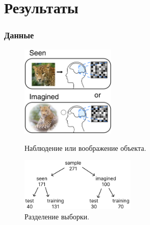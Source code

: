 \documentclass{beamer}
\begin{document}
	\section{Результаты}
	\begin{frame} 
		\frametitle{Данные}
		\begin{figure}
			\begin{minipage}{4.5cm}
				\includegraphics[width=4.5cm]{../images/data_1.png}
				\caption{Наблюдение или воображение объекта.} 
				\label{fg:12}
			\end{minipage}\hfill
			\begin{minipage}{5.5cm}
				\includegraphics[width=5.5cm]{../images/data_2.pdf}
				\caption{Разделение выборки.}
				\label{fg:13}
			\end{minipage}	
		\end{figure}
	\end{frame}

	\begin{frame} 
		\frametitle{}
		
	\end{frame}
		
		
\end{document}
